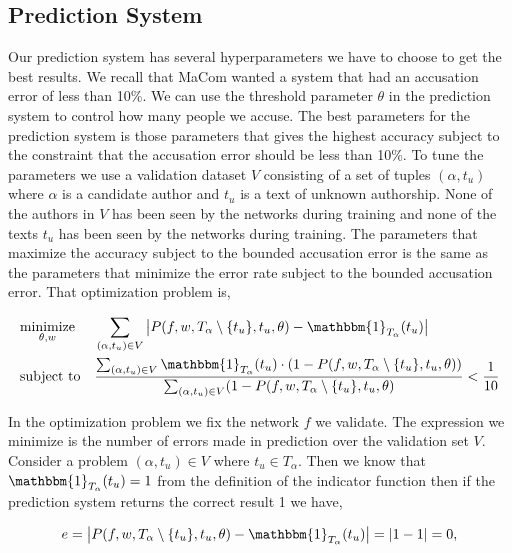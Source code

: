 \subsection{Prediction System}

Our prediction system has several hyperparameters we have to choose to get
the best results. We recall that MaCom wanted a system that had an accusation
error of less than 10\%. We can use the threshold parameter $\theta$ in the
prediction system to control how many people we accuse. The best parameters
for the prediction system is those parameters that gives the highest accuracy
subject to the constraint that the accusation error should be less than 10\%.
To tune the parameters we use a validation dataset $V$ consisting of a set of
tuples $(\alpha, t_u)$ where $\alpha$ is a candidate author and $t_u$ is a text
of unknown authorship. None of the authors in $V$ has been seen by the networks
during training and none of the texts $t_u$ has been seen by the networks during
training. The parameters that maximize the accuracy subject to the bounded
accusation error is the same as the parameters that minimize the error rate
subject to the bounded accusation error. That optimization problem is,

\begin{equation}
    \label{eq:prediction_system_minimization}
    \begin{aligned}
        & \underset{\theta, w}{\text{minimize}}
        & & \sum_{(\alpha, t_u) \in V} \left|
            P(f, w, T_\alpha \setminus \{t_u\}, t_u, \theta) -
            \mathbbm{1}_{T_\alpha}(t_u)
        \right| \\
        & \text{subject to}
        & & \frac{\sum_{(\alpha, t_u) \in V} \mathbbm{1}_{T_\alpha}(t_u) \cdot
            \left(1 - P(f, w, T_\alpha \setminus \{t_u\}, t_u, \theta)\right)}
{\sum_{(\alpha, t_u) \in V} (1 - P(f, w, T_\alpha \setminus \{t_u\}, t_u, \theta)} <
            \frac{1}{10}
    \end{aligned}
\end{equation}

In the optimization problem we fix the network $f$ we validate. The expression
we minimize is the number of errors made in prediction over the validation set
$V$. Consider a problem $(\alpha, t_u) \in V$ where $t_u \in T_\alpha$. Then we
know that $\mathbbm{1}_{T_\alpha}(t_u) = 1$ from the definition of the indicator
function then if the prediction system returns the correct result 1 we have,

\begin{equation}
    e = \left|
        P(f, w, T_\alpha \setminus \{t_u\}, t_u, \theta) -
        \mathbbm{1}_{T_\alpha}(t_u)
    \right| = |1 - 1| = 0,
\end{equation}

